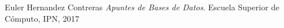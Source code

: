 \documentclass[12pt, fleqn]{report}                             %
\begin{document}

\begin{thebibliography}{10}

        Euler Hernandez Contreras
        \textit{Apuntes de Bases de Datos}. 
        Escuela Superior de Cómputo, IPN, 2017

\end{thebibliography}
\end{document}

